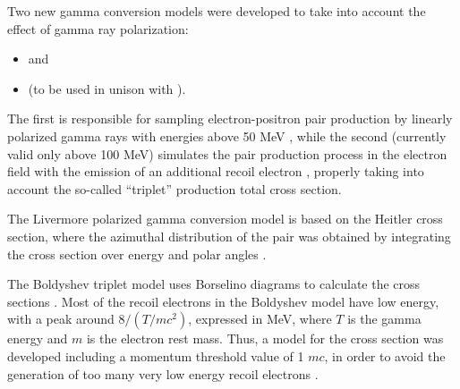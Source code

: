 Two new gamma conversion models were developed to take into account the effect
of gamma ray polarization:
\begin{itemize}
\item {} and
\item {} (to be used in unison with
      ).
\end{itemize}
The first is responsible for sampling electron-positron pair production by 
linearly polarized gamma rays with energies above 50 MeV \cite{embib:gamma11},
while the second (currently valid only above 100 MeV) simulates the pair 
production process in the electron field with the emission of an 
additional recoil electron \cite{embib:gamma12}, properly taking into account 
the so-called ``triplet'' production total cross section.

The Livermore polarized gamma conversion model is based on the Heitler cross
section, where the azimuthal distribution of the pair was obtained by 
integrating the cross section over energy and polar angles \cite{embib:gamma11}.

The Boldyshev triplet model uses Borselino diagrams to calculate the cross 
sections \cite{embib:pol3}.  Most of the recoil electrons in the Boldyshev model
have low energy, with a peak around $8/(T/mc^2)$, expressed in MeV, where $T$
is the gamma energy and $m$ is the electron rest mass.  Thus, a model for the
cross section was developed including a momentum threshold value of 1 $mc$, in
order to avoid the generation of too many very low energy recoil electrons
\cite{embib:pol4}. 

